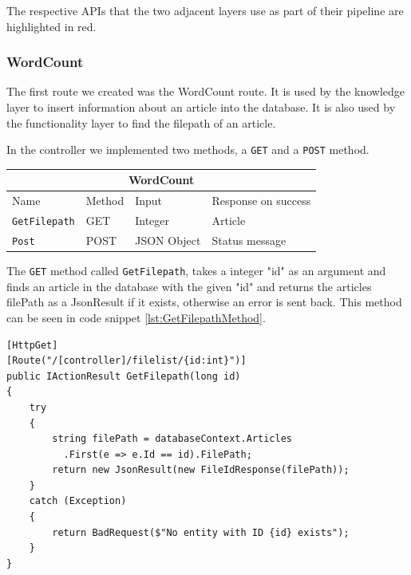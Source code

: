 The respective APIs that the two adjacent layers use as part of their pipeline are highlighted in red. 

\subsubsection{WordCount}

The first route we created was the WordCount route. It is used by the knowledge layer to insert information about an article into the database. It is also used by the functionality layer to find the filepath of an article.

In the controller we implemented two methods, a \texttt{GET} and a \texttt{POST} method.
\begin{table}[h]
    \begin{tabular}{|llll|}
    \hline
    \multicolumn{4}{|c|}{\textbf{WordCount}}                                                                                 \\ \hline
    \multicolumn{1}{|l|}{Name}                 & \multicolumn{1}{l|}{Method} & \multicolumn{1}{l|}{Input}       & Response on success       \\ \hline
    \multicolumn{1}{|l|}{\texttt{GetFilepath}} & \multicolumn{1}{l|}{GET}    & \multicolumn{1}{l|}{Integer}     & Article        \\ \hline
    \multicolumn{1}{|l|}{\texttt{Post}}        & \multicolumn{1}{l|}{POST}   & \multicolumn{1}{l|}{JSON Object} & Status message \\ \hline
    \end{tabular}
\end{table}

The \texttt{GET} method called \texttt{GetFilepath}, takes a integer "id" as an argument and finds an article in the database with the given "id" and returns the articles filePath as a JsonResult if it exists, otherwise an error is sent back.
This method can be seen in code snippet \ref{lst:GetFilepathMethod}.

\begin{lstlisting}[language=CSharp, caption={The \texttt{GetFilepath} method.}, label={lst:GetFilepathMethod}]
[HttpGet]
[Route("/[controller]/filelist/{id:int}")]
public IActionResult GetFilepath(long id)
{
    try
    {
        string filePath = databaseContext.Articles
          .First(e => e.Id == id).FilePath;
        return new JsonResult(new FileIdResponse(filePath));
    }
    catch (Exception)
    {
        return BadRequest($"No entity with ID {id} exists");
    }
}
\end{lstlisting}

